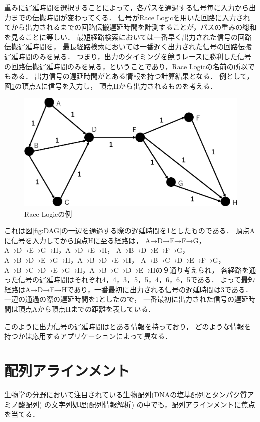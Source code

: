 重みに遅延時間を選択することによって，各パスを通過する信号毎に入力から出力までの伝搬時間が変わってくる．
信号がRace Logicを用いた回路に入力されてから出力されるまでの回路伝搬遅延時間を計測することが，パスの重みの総和を見ることに等しい．
最短経路検索においては一番早く出力された信号の回路伝搬遅延時間を，
最長経路検索においては一番遅く出力された信号の回路伝搬遅延時間のみを見る．
つまり，出力のタイミングを競うレースに勝利した信号の回路伝搬遅延時間のみを見る，ということであり，Race Logicの名前の所以でもある．
出力信号の遅延時間がとある情報を持つ計算結果となる．
例として，図\ref{fig:DAG1}の頂点Aに信号を入力し，
頂点Hから出力されるものを考える．
\begin{figure}[t!]
\begin{center}
\includegraphics[keepaspectratio,scale=0.5]{fig/2/DAG1.eps}
\caption{Race Logicの例}
\label{fig:DAG1}
\end{center}
\end{figure}
これは図\ref{fig:DAG}の一辺を通過する際の遅延時間を1としたものである．
頂点Aに信号を入力してから頂点Hに至る経路は，
A→D→E→F→G，A→D→E→G→H，A→D→E→H，
A→B→D→E→F→G，A→B→D→E→G→H，A→B→D→E→H，
A→B→C→D→E→F→G，A→B→C→D→E→G→H，A→B→C→D→E→Hの９通り考えられ，
各経路を通った信号の遅延時間はそれぞれ4，4，3，5，5，4，6，6，5である．
よって最短経路はA→D→E→Hであり，一番最初に出力される信号の遅延時間は3である．
一辺の通過の際の遅延時間を1としたので，
一番最初に出力された信号の遅延時間は頂点Aから頂点Hまでの距離を表している．

このように出力信号の遅延時間はとある情報を持っており，
どのような情報を持つかは応用するアプリケーションによって異なる．

\section{配列アラインメント}
生物学の分野において注目されている生物配列(DNAの塩基配列とタンパク質アミノ酸配列) の文字列処理(配列情報解析)
\cite{浅井潔2000配列情報と確立モデル,後藤修1998マルチプルアラインメントは生体高分子情報の交差点}
の中でも，配列アラインメントに焦点を当てる．

